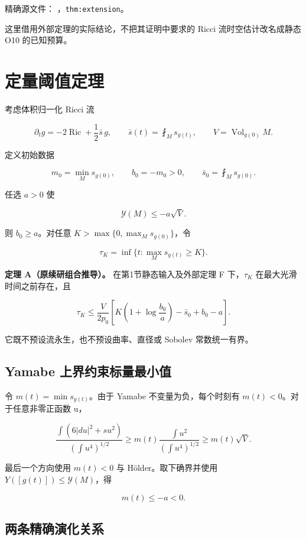 \documentclass[UTF8,11pt,fontset=none]{ctexart}
\theoremstyle{definition}
\theoremstyle{remark}
\begin{document}
精确源文件： ，\texttt{thm:extension}。

这里借用外部定理的实际结论，不把其证明中要求的 Ricci 流时空估计改名成静态 O10 的已知预算。

\section{定量阈值定理}\label{v3-ux5b9aux91cfux9608ux503cux5b9aux7406}

考虑体积归一化 Ricci 流

\[
 \partial_t g=-2\operatorname{Ric}+\frac12\bar s\,g,
 \qquad \bar s(t)=\fint_M s_{g(t)},
 \qquad V=\operatorname{Vol}_{g(0)}M.
\]

定义初始数据

\[
 m_0=\min_Ms_{g(0)},\qquad b_0=-m_0>0,
 \qquad \bar s_0=\fint_Ms_{g(0)}.
\]

任选 \(a>0\) 使

\[
 \mathcal Y(M)\le-a\sqrt V.
\]

则 \(b_0\ge a\)。对任意 \(K>\max\{0,\max_Ms_{g(0)}\}\)，令

\[
 \tau_K=\inf\{t:\max_Ms_{g(t)}\ge K\}.
\]

\textbf{定理 A（原续研组合推导）。} 在第1节静态输入及外部定理 F 下，\(\tau_K\) 在最大光滑时间之前存在，且

\[
 \boxed{
 \tau_K\le\frac{V}{2p_0}
 \left[
 K\left(1+\log\frac{b_0}{a}\right)-\bar s_0+b_0-a
 \right].
 }
\tag{3.A}
\]

它既不预设流永生，也不预设曲率、直径或 Sobolev 常数统一有界。

\subsection{Yamabe 上界约束标量最小值}\label{v3-yamabe-ux4e0aux754cux7ea6ux675fux6807ux91cfux6700ux5c0fux503c}

令 \(m(t)=\min s_{g(t)}\)。由于 Yamabe 不变量为负，每个时刻有 \(m(t)<0\)。对于任意非零正函数 u，

\[
 \frac{\int(6|du|^2+s u^2)}{(\int u^4)^{1/2}}
 \ge m(t)\frac{\int u^2}{(\int u^4)^{1/2}}
 \ge m(t)\sqrt V.
\]

最后一个方向使用 \(m(t)<0\) 与 Hölder。取下确界并使用 \(Y([g(t)])\le\mathcal Y(M)\)，得

\[
 \boxed{m(t)\le-a<0.}
\tag{3.3.1}
\]

\subsection{两条精确演化关系}\label{v3-ux4e24ux6761ux7cbeux786eux6f14ux5316ux5173ux7cfb}
\end{document}
